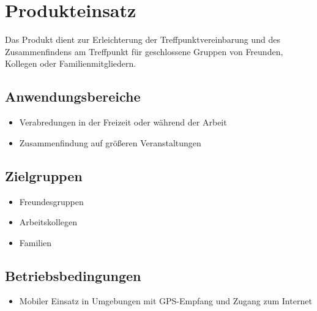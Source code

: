 \documentclass[parskip=full,11pt]{scrartcl}
\begin{document}
\pagebreak
\section{Produkteinsatz}
Das Produkt dient zur Erleichterung der Treffpunktvereinbarung und des Zusammenfindens
am Treffpunkt für geschlossene Gruppen von Freunden, Kollegen oder
Familienmitgliedern.

\subsection{Anwendungsbereiche}
\begin{itemize}
    \item Verabredungen in der Freizeit oder während der Arbeit
    \item Zusammenfindung auf größeren Veranstaltungen
\end{itemize}

\subsection{Zielgruppen}
\begin{itemize}
    \item Freundesgruppen
    \item Arbeitskollegen
    \item Familien
\end{itemize}

\subsection{Betriebsbedingungen}
\begin{itemize}
    \item Mobiler Einsatz in Umgebungen mit GPS-Empfang und Zugang zum Internet
\end{itemize}
\end{document}
